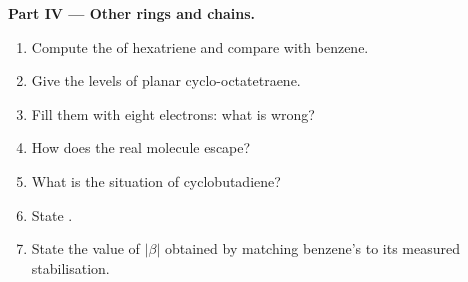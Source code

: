 \begin{problem}
\medskip
\noindent\textbf{Part IV --- Other rings and chains.}
\begin{enumerate}[resume]
  \item Compute the  of hexatriene and compare with benzene.
  \item Give the levels of planar cyclo-octatetraene.
  \item Fill them with eight electrons: what is wrong?
  \item How does the real molecule escape?
  \item What is the situation of cyclobutadiene?
  \item State .
  \item State the value of $|\beta|$ obtained by matching benzene's 
        to its measured stabilisation.
\end{enumerate}
\end{problem}
